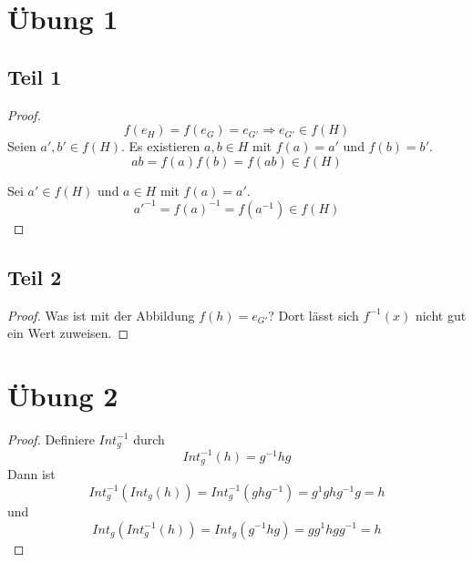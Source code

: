 \documentclass[10pt,a4paper]{article}
\begin{document}
\section{Übung 1}

\subsection{Teil 1}

\begin{proof}
  \begin{equation}
    f(e_{H}) = f(e_{G}) = e_{G'} \Rightarrow e_{G'} \in f(H)
  \end{equation}
  Seien $a', b' \in f(H)$.
  Es existieren $a, b \in H$ mit $f(a) = a'$ und $f(b) = b'$.
  \begin{equation}
    ab = f(a)f(b) = f(ab) \in f(H)
  \end{equation}

  Sei $a' \in f(H)$ und $a \in H$ mit $f(a) = a'$.
  \begin{equation}
    a'^{-1} = f(a)^{-1} = f(a^{-1}) \in f(H)
  \end{equation}
\end{proof}

\subsection{Teil 2}

\begin{proof}
  Was ist mit der Abbildung $f(h) = e_{G'}$?
  Dort lässt sich $f^{-1}(x)$ nicht gut ein Wert zuweisen.
\end{proof}

\section{Übung 2}

\begin{proof}
  Definiere $Int^{-1}_{g}$ durch
  \begin{equation}
    Int^{-1}_{g}(h) = g^{-1}hg
  \end{equation}
  Dann ist
  \begin{equation}
    Int^{-1}_{g}(Int_{g}(h)) = Int^{-1}_{g}(ghg^{-1}) = g^{1}ghg^{-1}g = h
  \end{equation}
  und
  \begin{equation}
    Int_{g}(Int^{-1}_{g}(h)) = Int_{g}(g^{-1}hg) = gg^{1}hgg^{-1} = h
  \end{equation}
\end{proof}
\end{document}
